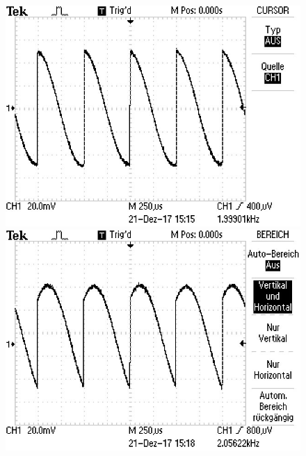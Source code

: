 \begin{figure}
\centering
\begin{minipage}{0.48\textwidth}
\centering
{}
\includegraphics[scale=.75]{content/images/00.jpg}
\end{minipage}
\begin{minipage}{0.48\textwidth}
\centering
{}
\includegraphics[scale=.75]{content/images/45.jpg}
\end{minipage}


\end{figure}
